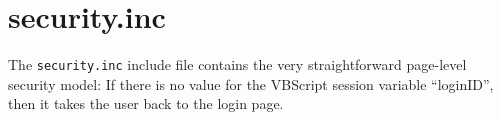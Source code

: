 \section{security.inc}

The \verb|security.inc| include file contains the very straightforward page-level
security model:  If there is no value for the VBScript session variable
``loginID'', then it takes the user back to the login page.


